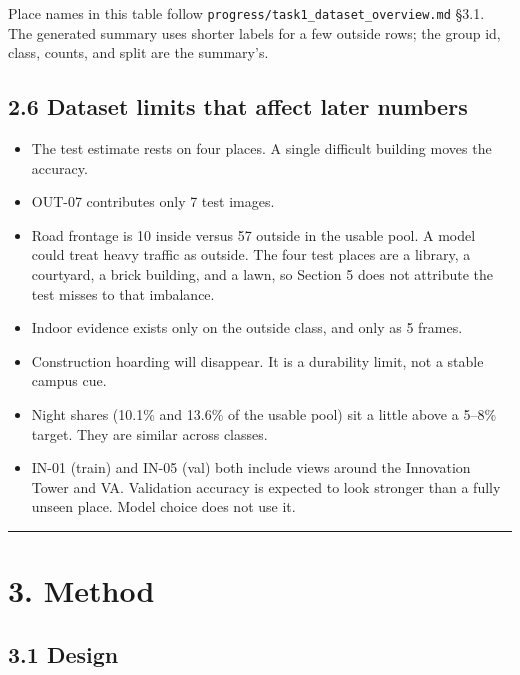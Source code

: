 \documentclass[11pt,a4paper]{article}
\providecommand{\tightlist}{%
  \setlength{\itemsep}{0pt}\setlength{\parskip}{0pt}}
\begin{document}
Place names in this table follow \texttt{progress/\allowbreak{}task1\_\allowbreak{}dataset\_\allowbreak{}overview.md} §3.1. The generated summary uses shorter labels for a few outside rows; the group id, class, counts, and split are the summary's.

\subsection{2.6 Dataset limits that affect later numbers}\label{dataset-limits-that-affect-later-numbers}

\begin{itemize}
\tightlist
\item
  The test estimate rests on four places. A single difficult building moves the accuracy.
\item
  OUT-07 contributes only 7 test images.
\item
  Road frontage is 10 inside versus 57 outside in the usable pool. A model could treat heavy traffic as outside. The four test places are a library, a courtyard, a brick building, and a lawn, so Section 5 does not attribute the test misses to that imbalance.
\item
  Indoor evidence exists only on the outside class, and only as 5 frames.
\item
  Construction hoarding will disappear. It is a durability limit, not a stable campus cue.
\item
  Night shares (10.1\% and 13.6\% of the usable pool) sit a little above a 5--8\% target. They are similar across classes.
\item
  IN-01 (train) and IN-05 (val) both include views around the Innovation Tower and VA. Validation accuracy is expected to look stronger than a fully unseen place. Model choice does not use it.
\end{itemize}

\begin{center}\rule{0.5\linewidth}{0.5pt}\end{center}

\section{3. Method}\label{method}

\subsection{3.1 Design}\label{design}
\end{document}
